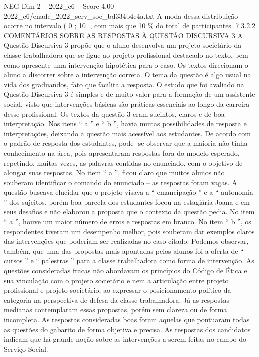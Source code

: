 \begin{textsample}{NEG Dim 2 – 2022\_c6 – Score 4.00 – 2022\_c6/enade\_2022\_serv\_soc\_bd334b4e4a.txt}
A moda dessa distribuição ocorre no intervalo ( 0 ; 10 ], com mais que 10 \% do total de participantes. 7.3.2.2 COMENTÁRIOS SOBRE AS RESPOSTAS À QUESTÃO DISCURSIVA 3 A Questão Discursiva 3 propõe que o aluno desenvolva um projeto societário da classe trabalhadora que se ligue ao projeto profissional destacado no texto, bem como apresente uma intervenção hipotética para o caso.
Os textos direcionam o aluno a discorrer sobre a intervenção correta.
O tema da questão é algo usual na vida dos graduandos, fato que facilita a resposta.
O estudo que foi avaliado na Questão Discursiva 3 é simples e de muito valor para a formação de um assistente social, visto que intervenções básicas são práticas essenciais ao longo da carreira desse profissional.
Os textos da questão 3 eram sucintos, claros e de boa interpretação.
Nos itens “ a ” e “ b ”, havia muitas possibilidades de resposta e interpretações, deixando a questão mais acessível aos estudantes.
De acordo com o padrão de resposta dos estudantes, pode -se observar que a maioria não tinha conhecimento na área, pois apresentaram respostas fora do modelo esperado, repetindo, muitas vezes, as palavras contidas no enunciado, com o objetivo de alongar suas respostas.
No item “ a ”, ficou claro que muitos alunos não souberam identificar o comando do enunciado – as respostas foram vagas.
A questão buscava elucidar que o projeto visava a “ emancipação ” e a “ autonomia ” dos sujeitos, porém boa parcela dos estudantes focou na estagiária Joana e em seus desafios e não elaborou a proposta que o contexto da questão pedia.
No item “ a ”, houve um maior número de erros e respostas em branco.
No item “ b ”, os respondentes tiveram um desempenho melhor, pois souberam dar exemplos claros das intervenções que poderiam ser realizadas no caso citado.
Podemos observar, também, que uma das propostas mais apontadas pelos alunos foi a oferta de “ cursos ” e “ palestras ” para a classe trabalhadora como forma de intervenção.
As questões consideradas fracas não abordavam os princípios do Código de Ética e sua vinculação com o projeto societário e nem a articulação entre projeto profissional e projeto societário, ao expressar o posicionamento político da categoria na perspectiva de defesa da classe trabalhadora.
Já as respostas medianas contemplaram essas propostas, porém sem clareza ou de forma incompleta.
As respostas consideradas boas foram aquelas que pontuaram todas as questões do gabarito de forma objetiva e precisa.
As respostas dos candidatos indicam que há grande noção sobre as intervenções a serem feitas no campo do Serviço Social.

\end{textsample}
